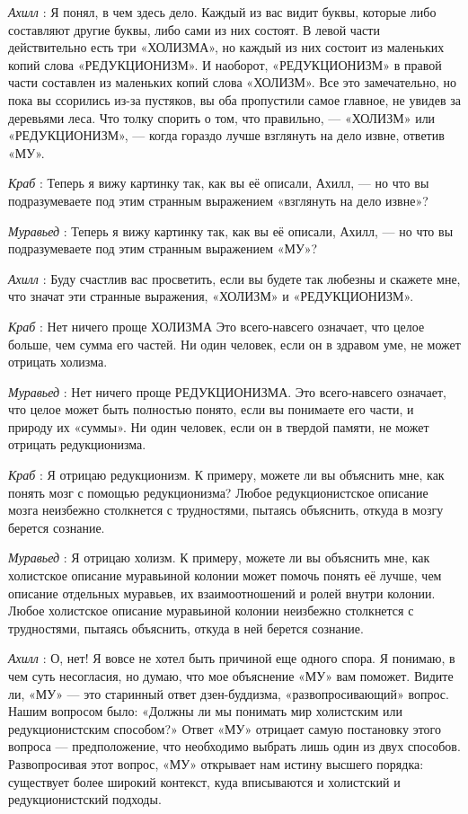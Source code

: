 \documentclass[../main.tex]{subfiles}
\begin{document}
\begin{dialogue}
\emph{Ахилл} : Я понял, в чем здесь дело. Каждый из вас видит буквы, которые либо составляют другие буквы, либо сами из них состоят. В левой части действительно есть три «ХОЛИЗМА», но каждый из них состоит из маленьких копий слова «РЕДУКЦИОНИЗМ». И наоборот, «РЕДУКЦИОНИЗМ» в правой части составлен из маленьких копий слова «ХОЛИЗМ». Все это замечательно, но пока вы ссорились из-за пустяков, вы оба пропустили самое главное, не увидев за деревьями леса. Что толку спорить о том, что правильно, --- «ХОЛИЗМ» или «РЕДУКЦИОНИЗМ», --- когда гораздо лучше взглянуть на дело извне, ответив «МУ».

\emph{Краб} : Теперь я вижу картинку так, как вы её описали, Ахилл, --- но что вы подразумеваете под этим странным выражением «взглянуть на дело извне»?

\emph{Муравьед} : Теперь я вижу картинку так, как вы её описали, Ахилл, --- но что вы подразумеваете под этим странным выражением «МУ»?

\emph{Ахилл} : Буду счастлив вас просветить, если вы будете так любезны и скажете мне, что значат эти странные выражения, «ХОЛИЗМ» и «РЕДУКЦИОНИЗМ».

\emph{Краб} : Нет ничего проще ХОЛИЗМА Это всего-навсего означает, что целое больше, чем сумма его частей. Ни один человек, если он в здравом уме, не может отрицать холизма.

\emph{Муравьед} : Нет ничего проще РЕДУКЦИОНИЗМА. Это всего-навсего означает, что целое может быть полностью понято, если вы понимаете его части, и природу их «суммы». Ни один человек, если он в твердой памяти, не может отрицать редукционизма.

\emph{Краб} : Я отрицаю редукционизм. К примеру, можете ли вы объяснить мне, как понять мозг с помощью редукционизма? Любое редукционистское описание мозга неизбежно столкнется с трудностями, пытаясь объяснить, откуда в мозгу берется сознание.

\emph{Муравьед} : Я отрицаю холизм. К примеру, можете ли вы объяснить мне, как холистское описание муравьиной колонии может помочь понять её лучше, чем описание отдельных муравьев, их взаимоотношений и ролей внутри колонии. Любое холистское описание муравьиной колонии неизбежно столкнется с трудностями, пытаясь объяснить, откуда в ней берется сознание.

\emph{Ахилл} : О, нет! Я вовсе не хотел быть причиной еще одного спора. Я понимаю, в чем суть несогласия, но думаю, что мое объяснение «МУ» вам поможет. Видите ли, «МУ» --- это старинный ответ дзен-буддизма, «развопросивающий» вопрос. Нашим вопросом было: «Должны ли мы понимать мир холистским или редукционистским способом?» Ответ «МУ» отрицает самую постановку этого вопроса --- предположение, что необходимо выбрать лишь один из двух способов. Развопросивая этот вопрос, «МУ» открывает нам истину высшего порядка: существует более широкий контекст, куда вписываются и холистский и редукционистский подходы.


\end{dialogue}
\end{document}
